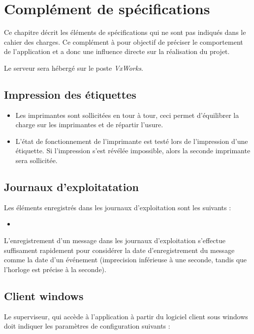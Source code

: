 \chapter{Complément de spécifications}

Ce chapitre décrit les éléments de spécifications qui ne sont pas indiqués dans
le cahier des charges. Ce complément à pour objectif de préciser le
comportement de l'application et a donc une influence directe sur la
réalisation du projet.

Le serveur sera hébergé sur le poste \textit{VxWorks}.

\section{Impression des étiquettes}

\begin{itemize}
	\item Les imprimantes sont sollicitées en tour à tour, ceci permet
d'équilibrer la charge sur les imprimantes et de répartir l'usure.
	\item L'état de fonctionnement de l'imprimante est testé lors de
l'impression d'une étiquette. Si l'impression s'est révélée impossible, alors
la seconde imprimante sera sollicitée.
\end{itemize}

\section{Journaux d'exploitatation}

Les éléments enregistrés dans les journaux d'exploitation sont les suivants :

\begin{itemize}
	\item 
\end{itemize}

L'enregistrement d'un message dans les journaux d'exploitation s'effectue
suffisament rapidement pour considérer la date d'enregistrement du message
comme la date d'un événement (imprecision inférieuse à une seconde, tandis que
l'horloge est précise à la seconde).

\section{Client windows}

Le superviseur, qui accède à l'application à partir du logiciel client sous
windows doit indiquer les paramètres de configuration suivants :

